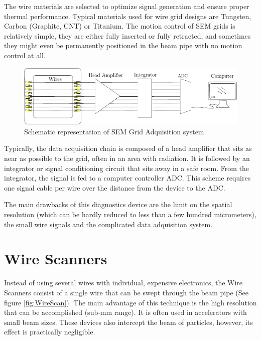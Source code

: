 The wire materials are selected to optimize signal generation and ensure proper thermal performance. Typical materials used for wire grid designs are Tungsten, Carbon (Graphite, CNT) or Titanium. The motion control of SEM grids is relatively simple, they are either fully inserted or fully retracted, and sometimes they might even be permanently positioned in the beam pipe with no motion control at all. 


\begin{figure}[h]
    \centering
    \includegraphics[width=1.0\columnwidth]{SEMgridDataADq/SEMdataAdc.pdf}
    \caption{Schematic representation of SEM Grid Adquisition system. }
    \label{fig:SEMGridReadOutSystem}
\end{figure}

Typically, the data acquisition chain is composed of a head amplifier that sits as near as possible to the grid, often in an area with radiation. It is followed by an integrator or signal conditioning circuit that sits away in a safe room. From the integrator, the signal is fed to a computer controller ADC. This scheme requires one signal cable per wire over the distance from the device to the ADC. 

The main drawbacks of this diagnostics device are the limit on the spatial resolution (which can be hardly reduced to less than a few hundred micrometers), the small wire signals and the complicated data adquisition system. 

\section{Wire Scanners}
\label{sec:WireScan}

Instead of using several wires with individual, expensive electronics, the Wire Scanners consist of a single wire that can be swept through the beam pipe (See figure \ref{fig:WireScan}). The main advantage of this technique is the high resolution that can be accomplished (sub-mm range). It is often used in accelerators with small beam sizes. These devices also intercept the beam of particles, however, its effect is practically negligible.

